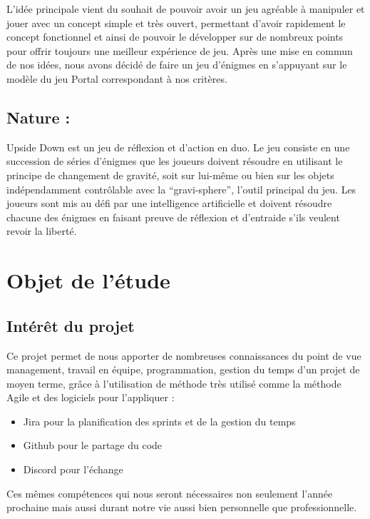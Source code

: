 \documentclass[a4paper,11pt]{article}
\begin{document}
	L’idée principale vient du souhait de pouvoir avoir un jeu agréable à manipuler 
    et jouer avec un concept simple et très ouvert, permettant d’avoir rapidement le concept fonctionnel et ainsi de pouvoir le développer sur de nombreux points pour offrir toujours une meilleur expérience de jeu. Après une mise en commun de nos idées, nous avons décidé de faire un jeu d’énigmes en s’appuyant sur le modèle du jeu Portal correspondant à nos critères.	

    \subsection{Nature :}
	Upside Down est un jeu de réflexion et d'action en duo.
Le jeu consiste en une succession de séries d'énigmes que les joueurs doivent 
résoudre en utilisant le principe de changement de gravité, soit sur lui-même ou bien sur les objets indépendamment contrôlable avec la “gravi-sphere”, l’outil principal du jeu. Les joueurs sont mis au défi par une intelligence artificielle et doivent résoudre chacune des énigmes en faisant preuve de réflexion et d'entraide s'ils veulent revoir la liberté.

\section{Objet de l’étude}

\subsection{Intérêt du projet}
Ce projet permet de nous apporter de nombreuses connaissances du point de vue management, 
travail en équipe, programmation, gestion du temps d’un projet de moyen terme, 
grâce à l’utilisation de méthode très utilisé comme la méthode Agile et des logiciels pour l’appliquer : \newline

\begin{itemize}
    \item Jira pour la planification des sprints et de la gestion du temps
    \item Github pour le partage du code
    \item Discord pour l’échange\newline
\end{itemize}

Ces mêmes compétences qui nous seront nécessaires non seulement 
l’année prochaine mais aussi durant notre vie aussi bien personnelle que professionnelle.
\end{document}

